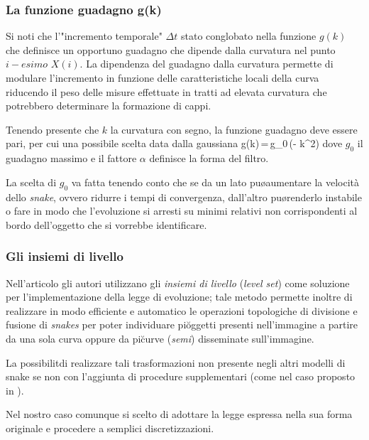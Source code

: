 \subsubsection{La funzione guadagno g(k)}

Si noti che l'"incremento temporale" $\Delta t$ \e stato conglobato nella
funzione $g(k)$ che definisce un opportuno guadagno che dipende dalla curvatura nel
punto $i-esimo$ $X(i)$.
La dipendenza del guadagno dalla curvatura permette di modulare l'incremento in funzione 
delle caratteristiche locali della curva riducendo il peso delle misure effettuate in
tratti ad elevata curvatura che potrebbero determinare la formazione di cappi.

Tenendo presente che $k$ \e la curvatura con segno, la funzione guadagno deve essere pari,
per cui una possibile scelta \e data dalla gaussiana
\be
g(k)\,=\,g_0\,\exp(- \alpha k^2)
\ee
dove $g_0$ \e il guadagno massimo e il fattore $\alpha$ definisce la forma del filtro.

La scelta di $g_0$ va fatta tenendo conto che se da un lato pu\o aumentare la velocità
dello {\it snake}, ovvero ridurre i tempi di convergenza, dall'altro pu\o renderlo instabile
o fare in modo che l'evoluzione si arresti su minimi relativi non corrispondenti al bordo
dell'oggetto che si vorrebbe identificare. 

\subsubsection{Gli insiemi di livello}

Nell'articolo \cite{Yezzi} gli autori utilizzano gli {\it insiemi di livello} ({\it level set}) \cite{Malladi}
come soluzione per l'implementazione della legge di evoluzione; tale metodo permette inoltre
di realizzare in modo efficiente e automatico le operazioni topologiche di divisione e fusione
di {\it snakes} per poter individuare pi\u oggetti presenti nell'immagine a partire da una sola
curva oppure da pi\u curve ({\it semi}) disseminate sull'immagine.

La possibilit\a di realizzare tali trasformazioni non \e 
presente negli altri modelli di snake se non con l'aggiunta di procedure supplementari 
(come nel caso proposto in \cite{Terzopoulos}). 

Nel nostro caso comunque si \e scelto di adottare la legge espressa nella sua forma originale
e procedere a semplici discretizzazioni.

